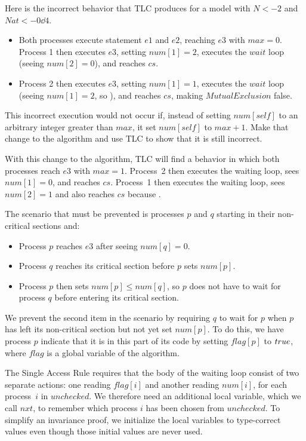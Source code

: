 \documentclass[fleqn,leqno]{article}
\begin{document}
\bigskip

Here is the incorrect behavior that TLC produces for a model with $N<-2$
and $Nat <- 0\dd 4$.
\begin{itemize}
\item Both processes execute statement $e1$ and $e2$, reaching $e3$ with
$max=0$.  Process 1 then executes $e3$, setting $num[1]=2$, executes the
$wait$ loop (seeing $num[2]=0$), and reaches $cs$.

\item Process 2 then executes $e3$, setting $num[1]=1$, executes the
$wait$ loop (seeing $num[1]=2$, so ),
and reaches $cs$, making $MutualExclusion$ false.
\end{itemize}
This incorrect execution would not occur if, instead of setting $num[self]$
to an arbitrary integer greater than $max$, it set $num[self]$ to $max+1$.
Make that change to the algorithm and use TLC to show that it is still
incorrect. 

\bigskip

With this change to the algorithm, TLC will find a behavior in which both
processes reach $e3$ with $max=1$.  Process~2 then executes the
waiting loop, sees $num[1]=0$, and reaches $cs$.  Process~1 then
executes the waiting loop, sees $num[2]=1$ and also reaches $cs$
because .

The scenario that must be prevented is processes $p$ and $q$ starting
in their non-critical sections and:
\begin{itemize}
\item Process $p$ reaches $e3$ after seeing $num[q]=0$.

\item Process $q$ reaches its critical section before $p$ sets $num[p]$.

\item Process $p$ then sets $num[p]\leq num[q]$, so $p$ does not
have to wait for process $q$ before entering its critical section.
\end{itemize}
We prevent the second item in the scenario by requiring $q$ to wait
for $p$ when $p$ has left its non-critical section but not yet set
$num[p]$.  To do this, we have process $p$ indicate that it is in this
part of its code by setting $flag[p]$ to $\TRUE$, where
$flag$ is a global variable of the algorithm.

 The 
Single Access Rule requires that the body of the waiting loop consist
of two separate actions: one reading $flag[i]$ and another reading
$num[i]$, for each process~$i$ in $unchecked$.  We therefore need an
additional local variable, which we call $nxt$, to remember which
process $i$ has been chosen from $unchecked$.  To simplify an
invariance proof, we initialize the local variables to type-correct
values even though those initial values are never used.
\end{document}
